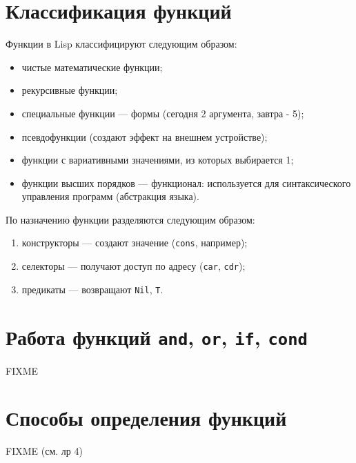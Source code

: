\section{Классификация функций}

Функции в Lisp классифицируют следующим образом:

\begin{itemize}
    \item чистые математические функции;
    \item рекурсивные функции;
    \item специальные функции --- формы (сегодня 2 аргумента, завтра - 5);
    \item псевдофункции (создают эффект на внешнем устройстве);
    \item функции с вариативными значениями, из которых выбирается 1;
    \item функции высших порядков --- функционал: используется для синтаксического управления программ (абстракция языка).
\end{itemize}

По назначению функции разделяются следующим образом:

\begin{enumerate}
    \item конструкторы --- создают значение (\texttt{cons}, например);
    \item селекторы --- получают доступ по адресу (\texttt{car}, \texttt{cdr});
    \item предикаты --- возвращают \texttt{Nil}, \texttt{T}.
\end{enumerate}

\section{Работа функций \texttt{and}, \texttt{or}, \texttt{if}, \texttt{cond}}

FIXME

\section{Способы определения функций}

FIXME (см. лр 4)
